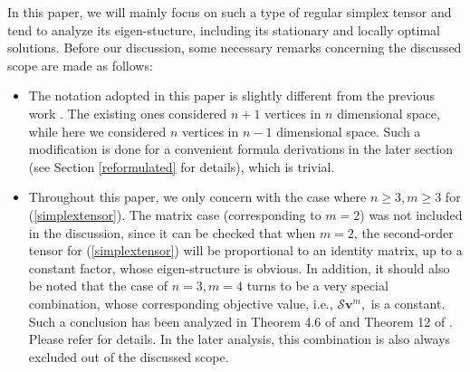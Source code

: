 %
%

 
In  this paper, 
we will mainly focus on such a type of 	 
regular simplex tensor and tend to  analyze its eigen-stucture, including its stationary and locally optimal solutions. 
Before our discussion,	some necessary remarks   concerning  the discussed  scope    are  made as follows:
	\begin{remark}\label{RemarkScope}
		
		\begin{itemize}
			\item The notation  adopted   in this paper  is slightly  different from the previous work \cite{RobustEigen,teneigenstructure}.
			The existing ones considered  $n+1$ vertices in $n $ dimensional space, while  here we
			considered  $n$ vertices in $n-1 $ dimensional space. 
			Such a  modification is done for a convenient  formula  derivations  in the later  section (see Section  \ref{reformulated} for details), which is  trivial.
				\item 
				Throughout this paper,  we  only  concern with the case where 
				$n \ge 3, m \ge 3$  for (\ref{simplextensor}). 
				The matrix case (corresponding to 	$ m = 2$)  was not included in the discussion, since it can be checked that 
				when $m=2$, the second-order tensor for (\ref{simplextensor}) will be 
				proportional to an  identity matrix, up to a constant factor, whose  eigen-structure is  obvious.
				In addition,  it should also be noted that 
				the case  of 		$n = 3, m = 4$   turns to be  a very  special combination, 
				whose corresponding   objective  value, i.e., 
				$
			\mathcal S \mathbf v^{m}, 
			$   is a constant.
				Such a  conclusion has been analyzed in Theorem 4.6 of \cite{RobustEigen}  
				 and Theorem 12 of \cite{teneigenstructure}.
				Please refer for  details. 		
				In the later analysis, 
				this combination is also always excluded out of the discussed scope. 	
		\end{itemize}
	\end{remark}
		
